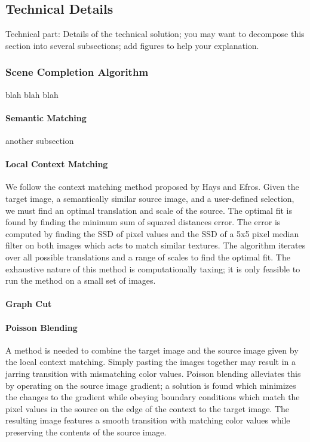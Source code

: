 \documentclass[11pt]{amsart}
\begin{document}
\subsection{Technical Details}
Technical part: Details of the technical solution; you may want to decompose this section into several subsections; add figures to help your explanation. 
\subsubsection{Scene Completion Algorithm}
blah blah blah

\paragraph{\sc Semantic Matching} 
another subsection

\paragraph{\sc Local Context Matching}
We follow the context matching method proposed by Hays and Efros.\cite{Hays:2007} Given the target image, a semantically similar source image, and a user-defined selection, we must find an optimal translation and scale of the source. The optimal fit is found by finding the minimum sum of squared distances error. The error is computed by finding the SSD of pixel values and the SSD of a 5x5 pixel median filter on both images which acts to match similar textures. The algorithm iterates over all possible translations and a range of scales to find the optimal fit. The exhaustive nature of this method is computationally taxing; it is only feasible to run the method on a small set of images.

\paragraph{\sc Graph Cut}

\paragraph{\sc Poisson Blending}
A method is needed to combine the target image and the source image given by the local context matching. Simply pasting the images together may result in a jarring transition with mismatching color values. Poisson blending alleviates this by operating on the source image gradient; a solution is found which minimizes the changes to the gradient while obeying boundary conditions which match the pixel values in the source on the edge of the context to the target image. The resulting image features a smooth transition with matching color values while preserving the contents of the source image.
\end{document}
